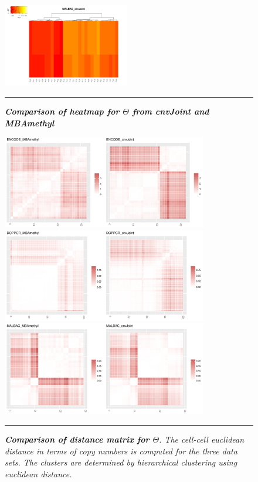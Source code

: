 \documentclass[11pt]{article}
\begin{document}
\begin{figure}[h]
\includegraphics[width=0.49\textwidth]{lung_cnvJoint_theta_heat.pdf}
    \rule{\textwidth}{1pt}
\caption{\label{thetaheatmap}\textit{
\textbf{Comparison of heatmap for $\Theta$ from cnvJoint and MBAmethyl}
}}
\end{figure}

\begin{figure}[h]
\centering
\includegraphics[width=0.8\textwidth]{encode_distmat_heat.pdf}\\
\includegraphics[width=0.8\textwidth]{poly_distmat_heat.pdf}\\
\includegraphics[width=0.8\textwidth]{lung_distmat_heat.pdf}\\
\rule{\textwidth}{1pt}
\caption{\label{distmat_heat}\textit{
\textbf{Comparison of distance matrix for $\Theta$}. The cell-cell euclidean distance in terms of copy numbers is computed for the three data sets. The clusters are determined by hierarchical clustering using euclidean distance. 
}}
\end{figure}
\end{document}
